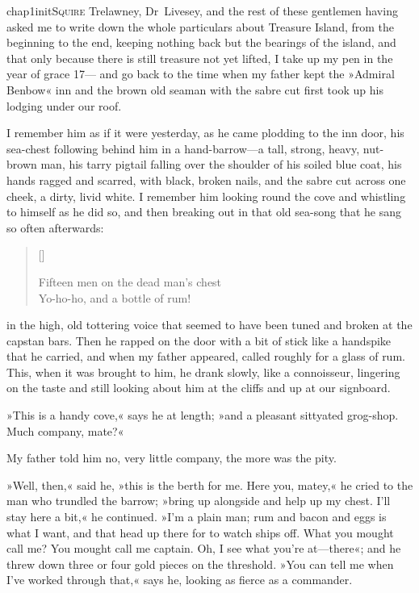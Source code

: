 

\lettrine[lines=5,image=true,findent=2pt]{chap1initS}{quire} Trelawney, Dr~Livesey, and the rest of these gentlemen having asked me to write down the whole particulars about Treasure Island, from the beginning to the end, keeping nothing back but the bearings of the island, and that only because there is still treasure not yet lifted, I take up my pen in the year of grace 17--- and go back to the time when my father kept the »Admiral Benbow« inn and the brown old seaman with the sabre cut first took up his lodging under our roof.

I remember him as if it were yesterday, as he came plodding to the inn door, his sea-chest following behind him in a hand-barrow---a tall, strong, heavy, nut-brown man, his tarry pigtail falling over the shoulder of his soiled blue coat, his hands ragged and scarred, with black, broken nails, and the sabre cut across one cheek, a dirty, livid white. I remember him looking round the cove and whistling to himself as he did so, and then breaking out in that old sea-song that he sang so often afterwards:

\settowidth{\versewidth}{Fifteen men on the dead man’s chest---}
\begin{verse}[\versewidth]
\begin{altverse}
Fifteen men on the dead man’s chest\longdash\\
Yo-ho-ho, and a bottle of rum!
\end{altverse}
\end{verse}

in the high, old tottering voice that seemed to have been tuned and broken at the capstan bars. Then he rapped on the door with a bit of stick like a handspike that he carried, and when my father appeared, called roughly for a glass of rum. This, when it was brought to him, he drank slowly, like a connoisseur, lingering on the taste and still looking about him at the cliffs and up at our signboard.

»This is a handy cove,« says he at length; »and a pleasant sittyated grog-shop. Much company, mate?«

My father told him no, very little company, the more was the pity.

»Well, then,« said he, »this is the berth for me. Here you, matey,« he cried to the man who trundled the barrow; »bring up alongside and help up my chest. I'll stay here a bit,« he continued. »I'm a plain man; rum and bacon and eggs is what I want, and that head up there for to watch ships off. What you mought call me? You mought call me captain. Oh, I see what you're at---there«; and he threw down three or four gold pieces on the threshold. »You can tell me when I've worked through that,« says he, looking as fierce as a commander.

